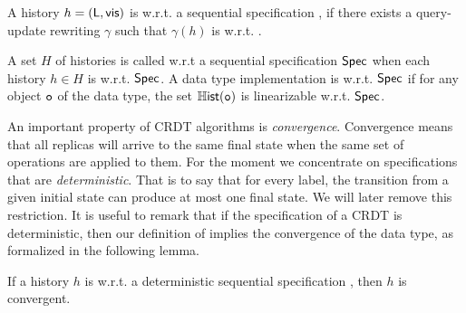 \begin{definition}[\CRDTLin{}]
  \label{definition:distributed linearizability} A history $h =
  (\mathsf{L},\mathsf{vis})$ is \crdtlinearizable{} w.r.t. a
   sequential specification
  \Spec{}, if there exists a query-update rewriting $\gamma$ such that $\gamma(h)$ is \crdtlinearizable{} w.r.t. \Spec{}.
\end{definition}


A set $H$ of histories is called \crdtlinearizable{} w.r.t a
sequential specification $\mathsf{Spec}$ when each history $h\in H$ is
\crdtlinearizable{} w.r.t.
$\mathsf{Spec}$.
A data type implementation is \crdtlinearizable{} w.r.t.
$\mathsf{Spec}$ if for any object $\mathtt{o}$ of the data type, the set
$\mathbb{H}\mathsf{ist}(\mathtt{o})$ is linearizable w.r.t. $\mathsf{Spec}$. 



An important property of CRDT algorithms is \emph{convergence}.
Convergence means that all replicas will arrive to the same final
state when the same set of operations are applied to them.
For the moment we concentrate on specifications that are
\emph{deterministic}.
That is to say that for every label, the transition from a given
initial state can produce at most one final state.
We will later remove this restriction.
It is useful to remark that if the specification of a CRDT is
deterministic, then our definition of \crdtlin{} implies the
convergence of the data type, as formalized in the following lemma.

\begin{lemma}
\label{lemma:distributed linarizability implies convergence}
If a history $h$ is \crdtlinearizable{} w.r.t. a deterministic
sequential specification \Spec, then $h$ is convergent.
\end{lemma}

